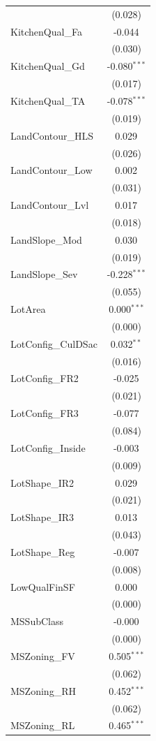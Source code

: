 \begin{table}[!htbp]
\begin{tabular}{@{\extracolsep{5pt}}lc}
& (0.028) \\
 KitchenQual_Fa & -0.044$^{}$ \\
& (0.030) \\
 KitchenQual_Gd & -0.080$^{***}$ \\
& (0.017) \\
 KitchenQual_TA & -0.078$^{***}$ \\
& (0.019) \\
 LandContour_HLS & 0.029$^{}$ \\
& (0.026) \\
 LandContour_Low & 0.002$^{}$ \\
& (0.031) \\
 LandContour_Lvl & 0.017$^{}$ \\
& (0.018) \\
 LandSlope_Mod & 0.030$^{}$ \\
& (0.019) \\
 LandSlope_Sev & -0.228$^{***}$ \\
& (0.055) \\
 LotArea & 0.000$^{***}$ \\
& (0.000) \\
 LotConfig_CulDSac & 0.032$^{**}$ \\
& (0.016) \\
 LotConfig_FR2 & -0.025$^{}$ \\
& (0.021) \\
 LotConfig_FR3 & -0.077$^{}$ \\
& (0.084) \\
 LotConfig_Inside & -0.003$^{}$ \\
& (0.009) \\
 LotShape_IR2 & 0.029$^{}$ \\
& (0.021) \\
 LotShape_IR3 & 0.013$^{}$ \\
& (0.043) \\
 LotShape_Reg & -0.007$^{}$ \\
& (0.008) \\
 LowQualFinSF & 0.000$^{}$ \\
& (0.000) \\
 MSSubClass & -0.000$^{}$ \\
& (0.000) \\
 MSZoning_FV & 0.505$^{***}$ \\
& (0.062) \\
 MSZoning_RH & 0.452$^{***}$ \\
& (0.062) \\
 MSZoning_RL & 0.465$^{***}$ \\

\end{tabular}
\end{table}
